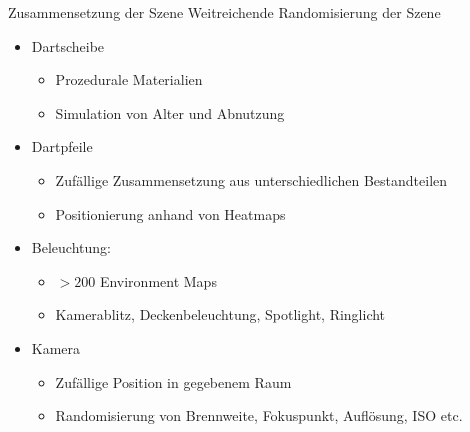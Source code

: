 \begin{frame}{Zusammensetzung der Szene}
    Weitreichende Randomisierung der Szene
    \begin{itemize}\footnotesize
        \setlength\itemsep{0em}
        \item Dartscheibe
              \vspace*{-0.1cm}
              \begin{itemize}\footnotesize
                  \item Prozedurale Materialien
                  \item Simulation von Alter und Abnutzung
              \end{itemize}
              \vspace*{-0.15cm}
        \item Dartpfeile
              \vspace*{-0.1cm}
              \begin{itemize}\footnotesize
                  \item Zufällige Zusammensetzung aus unterschiedlichen Bestandteilen
                  \item Positionierung anhand von Heatmaps
              \end{itemize}
              \vspace*{-0.15cm}
        \item Beleuchtung:
              \vspace*{-0.1cm}
              \begin{itemize}\footnotesize
                  \item $>200$ Environment Maps
                  \item Kamerablitz, Deckenbeleuchtung, Spotlight, Ringlicht
              \end{itemize}
              \vspace*{-0.15cm}
        \item Kamera
              \vspace*{-0.1cm}
              \begin{itemize}\footnotesize
                  \item Zufällige Position in gegebenem Raum
                  \item Randomisierung von Brennweite, Fokuspunkt, Auflösung, ISO etc.
              \end{itemize}
    \end{itemize}

\end{frame}

